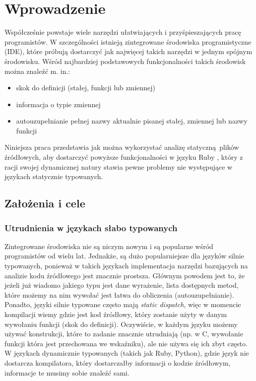 \documentclass[declaration,shortabstract,mgr]{iithesis}
\author         {Rafał Łasocha}
\begin{document}
\chapter{Wprowadzenie}

Współcześnie powstaje wiele narzędzi ułatwiających i przyśpieszających pracę programistów.
W szczególności istnieją zintegrowane środowiska programistyczne (IDE), które próbują dostarczyć jak najwięcej takich narzędzi w jednym spójnym środowisku. Wśród najbardziej podstawowych funkcjonalności takich środowisk można znaleźć m. in.:

\begin{itemize}
\item skok do definicji (stałej, funkcji lub zmiennej)
\item informacja o typie zmiennej
\item autouzupełnianie pełnej nazwy aktualnie pisanej stałej, zmiennej lub nazwy funkcji
\end{itemize}

Niniejsza praca przedstawia jak można wykorzystać analizę statyczną plików źródłowych, aby dostarczyć powyższe funkcjonalności w języku Ruby \cite{RUBY}, który z racji swojej dynamicznej natury stawia pewne problemy nie występujące w językach statycznie typowanych.

\section{Założenia i cele}

\subsection{Utrudnienia w językach słabo typowanych}

Zintegrowane środowiska nie są niczym nowym i są popularne wśród programistów od wielu lat.
Jednakże, są dużo popularniejsze dla języków silnie typowanych, ponieważ w takich językach implementacja narzędzi bazujących na analizie kodu źródłowego jest znacznie prostsza. Głównym powodem jest to, że jeżeli już wiadomo jakiego typu jest dane wyrażenie, lista dostępnych metod, które możemy na nim wywołać jest łatwa do obliczenia (autouzupełnianie).
Ponadto, języki silnie typowane często mają \textit{static dispatch}, więc w momencie kompilacji wiemy gdzie jest kod źródłowy, który zostanie użyty w danym wywołaniu funkcji (skok do definicji).
Oczywiście, w każdym języku możemy używać konstrukcji, które to zadanie znacznie utrudniają (np. w C, wywołanie funkcji która jest przechowana we wskaźniku), ale nie używa się ich zbyt często.
W językach dynamicznie typowanych (takich jak Ruby, Python), gdzie język nie dostarcza kompilatora, który dostarczałby informacji o kodzie źródłowym, informacje te musimy sobie znaleźć sami.
\end{document}
